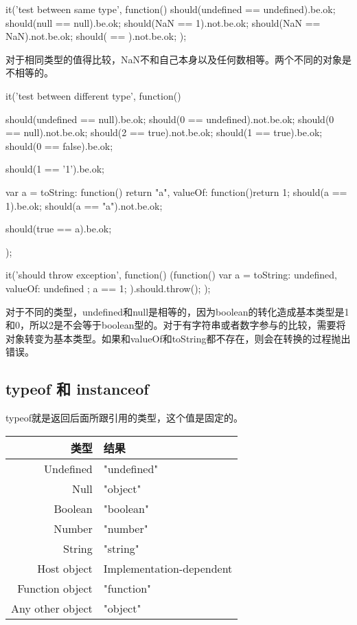 \begin{JavaScript}
		it('test between same type', function(){
			should(undefined == undefined).be.ok;
			should(null == null).be.ok;
			should(NaN == 1).not.be.ok;
			should(NaN == NaN).not.be.ok;
			should({} == {}).not.be.ok;
		});
\end{JavaScript}
对于相同类型的值得比较，NaN不和自己本身以及任何数相等。两个不同的对象是不相等的。

\begin{JavaScript}
		it('test between different type', function(){
			should(undefined == null).be.ok;
			should(0 == undefined).not.be.ok;
			should(0 == null).not.be.ok;
			should(2 == true).not.be.ok;
			should(1 == true).be.ok;
			should(0 == false).be.ok;

			should(1 == '1').be.ok;

			var a = {
				toString: function() {return "a"},
				valueOf: function(){return 1;}
			}
			should(a == 1).be.ok;
			should(a == "a").not.be.ok;

			should(true == a).be.ok;
		});
\end{JavaScript}
\begin{JavaScript}
		it('should throw exception', function(){
			(function(){
				var a = {toString: undefined, valueOf: undefined} ;
				a == 1;
			}).should.throw();
		});
\end{JavaScript}
对于不同的类型，undefined和null是相等的，因为boolean的转化造成基本类型是1和0，所以2是不会等于boolean型的。对于有字符串或者数字参与的比较，需要将对象转变为基本类型。如果和valueOf和toString都不存在，则会在转换的过程抛出错误。

\subsection{typeof 和 instanceof}
typeof就是返回后面所跟引用的类型，这个值是固定的。

\begin{tabular}{|r|l|}
		\hline
		类型	& 	结果\\
		\hline
		Undefined 	& 	"undefined" \\
		\hline
		Null		&	"object" \\
		\hline
		Boolean		&	"boolean" \\
		\hline
		Number		&	"number" \\
		\hline
		String		&	"string" \\
		\hline
		Host object & Implementation-dependent \\
		\hline
		Function object & "function"\\
		\hline
		Any other object &	"object"\\
		\hline
\end{tabular}

